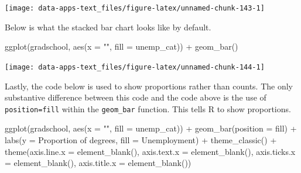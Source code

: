 \documentclass[
]{book}
\makeatletter
\newenvironment{Shaded}{\begin{snugshade}}{\end{snugshade}}
\newcommand{\AttributeTok}[1]{\textcolor[rgb]{0.61,0.61,0.61}{#1}}
\newcommand{\FunctionTok}[1]{\textcolor[rgb]{0,0,0}{#1}}
\newcommand{\NormalTok}[1]{#1}
\newcommand{\SpecialCharTok}[1]{\textcolor[rgb]{0,0,0}{#1}}
\newcommand{\StringTok}[1]{\textcolor[rgb]{0.5,0.5,0.5}{#1}}
\newenvironment{kframe}{%
\medskip{}
\setlength{\fboxsep}{.8em}
 \def\at@end@of@kframe{}%
 \ifinner\ifhmode%
  \def\at@end@of@kframe{\end{minipage}}%
  \begin{minipage}{\columnwidth}%
 \fi\fi%
 \def\FrameCommand##1{\hskip\@totalleftmargin \hskip-\fboxsep
 \colorbox{shadecolor}{##1}\hskip-\fboxsep
     \hskip-\linewidth \hskip-\@totalleftmargin \hskip\columnwidth}%
 \MakeFramed {\advance\hsize-\width
   \@totalleftmargin\z@ \linewidth\hsize
   \@setminipage}}%
 {\par\unskip\endMakeFramed%
 \at@end@of@kframe}
\renewenvironment{Shaded}{\begin{kframe}}{\end{kframe}}
\makeatother
\begin{document}
\begin{center}\texttt{[image: data-apps-text\_files/figure-latex/unnamed-chunk-143-1]} \end{center}

Below is what the stacked bar chart looks like by default.

\begin{Shaded}
\begin{Highlighting}[]
\FunctionTok{ggplot}\NormalTok{(gradschool, }\FunctionTok{aes}\NormalTok{(}\AttributeTok{x =} \StringTok{""}\NormalTok{, }\AttributeTok{fill =}\NormalTok{ unemp\_cat)) }\SpecialCharTok{+}
  \FunctionTok{geom\_bar}\NormalTok{()}
\end{Highlighting}
\end{Shaded}

\begin{center}\texttt{[image: data-apps-text\_files/figure-latex/unnamed-chunk-144-1]} \end{center}

Lastly, the code below is used to show proportions rather than counts. The only substantive difference between this code and the code above is the use of \texttt{position=\textquotesingle{}fill\textquotesingle{}} within the \texttt{geom\_bar} function. This tells R to show proportions.

\begin{Shaded}
\begin{Highlighting}[]
\FunctionTok{ggplot}\NormalTok{(gradschool, }\FunctionTok{aes}\NormalTok{(}\AttributeTok{x =} \StringTok{""}\NormalTok{, }\AttributeTok{fill =}\NormalTok{ unemp\_cat)) }\SpecialCharTok{+}
  \FunctionTok{geom\_bar}\NormalTok{(}\AttributeTok{position =} \StringTok{\textquotesingle{}fill\textquotesingle{}}\NormalTok{) }\SpecialCharTok{+}
  \FunctionTok{labs}\NormalTok{(}\AttributeTok{y =} \StringTok{\textquotesingle{}Proportion of degrees\textquotesingle{}}\NormalTok{,}
       \AttributeTok{fill =} \StringTok{\textquotesingle{}Unemployment\textquotesingle{}}\NormalTok{) }\SpecialCharTok{+}
  \FunctionTok{theme\_classic}\NormalTok{() }\SpecialCharTok{+}
  \FunctionTok{theme}\NormalTok{(}\AttributeTok{axis.line.x =} \FunctionTok{element\_blank}\NormalTok{(),}
        \AttributeTok{axis.text.x =} \FunctionTok{element\_blank}\NormalTok{(),}
        \AttributeTok{axis.ticks.x =} \FunctionTok{element\_blank}\NormalTok{(),}
        \AttributeTok{axis.title.x =} \FunctionTok{element\_blank}\NormalTok{())}
\end{Highlighting}
\end{Shaded}
\end{document}
